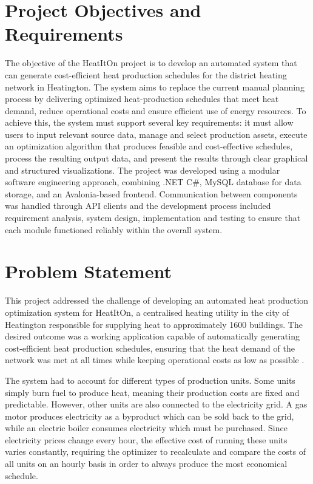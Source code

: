 \section{Project Objectives and Requirements}

\hspace*{1cm}The objective of the HeatItOn project is to develop an automated system that can generate cost-efficient heat production schedules for the district heating network in Heatington. The system aims to replace the current manual planning process by delivering optimized heat-production schedules that meet heat demand, reduce operational costs and ensure efficient use of energy resources. To achieve this, the system must support several key requirements: it must allow users to input relevant source data, manage and select production assets, execute an optimization algorithm that produces feasible and cost-effective schedules, process the resulting output data, and present the results through clear graphical and structured visualizations. The project was developed using a modular software engineering approach, combining .NET C\#, MySQL database for data storage, and an Avalonia-based frontend. Communication between components was handled through API clients and the development process included requirement analysis, system design, implementation  and testing to ensure that each module functioned reliably within the overall system. 

\section{Problem Statement}
\hspace*{1cm}This project addressed the challenge of developing an automated heat production optimization system for HeatItOn, a centralised 
heating utility in the city of Heatington responsible for supplying heat 
to approximately 1600 buildings. The desired outcome was a working 
application capable of automatically generating cost-efficient heat 
production schedules, ensuring that the heat demand of the network was 
met at all times while keeping operational costs as low as possible \cite{projectdata}.

\hspace*{1cm}The system had to account for different types of production units. Some units simply burn fuel to produce heat, meaning their production costs are fixed and predictable. However, other units are also connected to the electricity grid. A gas motor produces electricity as a byproduct which can be sold back to the grid, while an electric boiler consumes electricity which must be purchased. Since electricity prices change every hour, the effective cost of running these units varies constantly, requiring the optimizer to recalculate and compare the costs of all units on an hourly basis in order to always produce the most economical schedule.  

